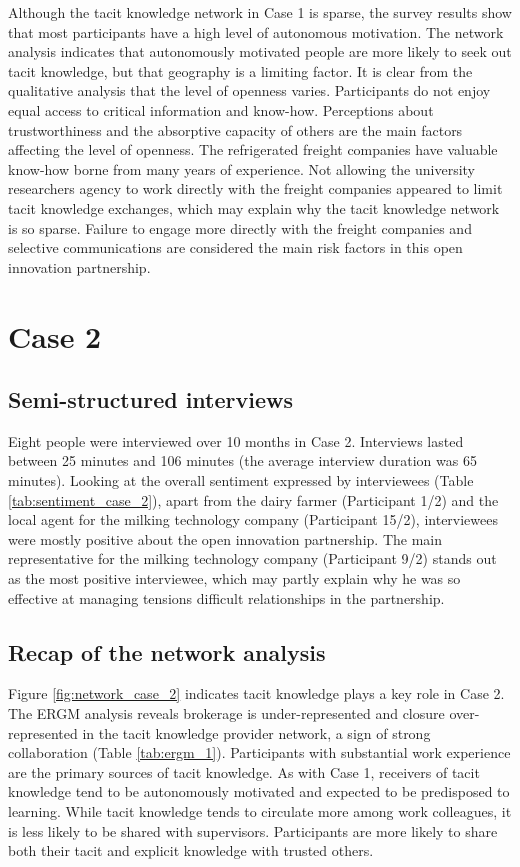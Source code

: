 Although the tacit knowledge network in Case 1 is sparse, the survey results show that most participants have a high level of autonomous motivation. The network analysis indicates that autonomously motivated people are more likely to seek out tacit knowledge, but that geography is a limiting factor. It is clear from the qualitative analysis that the level of openness varies. Participants do not enjoy equal access to critical information and know-how. Perceptions about trustworthiness and the absorptive capacity of others are the main factors affecting the level of openness. The refrigerated freight companies have valuable know-how borne from many years of experience. Not allowing the university researchers agency to work directly with the freight companies appeared to limit tacit knowledge exchanges, which may explain why the tacit knowledge network is so sparse. Failure to engage more directly with the freight companies and selective communications are considered the main risk factors in this open innovation partnership.

\section{Case 2}

\subsection{Semi-structured interviews}

Eight people were interviewed over 10 months in Case 2. Interviews lasted between 25 minutes and 106 minutes (the average interview duration was 65 minutes). Looking at the overall sentiment expressed by interviewees (Table \ref{tab:sentiment_case_2}), apart from the dairy farmer (Participant 1/2) and the local agent for the milking technology company (Participant 15/2), interviewees were mostly positive about the open innovation partnership. The main representative for the milking technology company (Participant 9/2) stands out as the most positive interviewee, which may partly explain why he was so effective at managing tensions difficult relationships in the partnership.

\subsection{Recap of the network analysis}

Figure \ref{fig:network_case_2} indicates tacit knowledge plays a key role in Case 2. The ERGM analysis reveals brokerage is under-represented and closure over-represented in the tacit knowledge provider network, a sign of strong collaboration (Table \ref{tab:ergm_1}). Participants with substantial work experience are the primary sources of tacit knowledge. As with Case 1, receivers of tacit knowledge tend to be autonomously motivated and expected to be predisposed to learning. While tacit knowledge tends to circulate more among work colleagues, it is less likely to be shared with supervisors. Participants are more likely to share both their tacit and explicit knowledge with trusted others. \medskip

